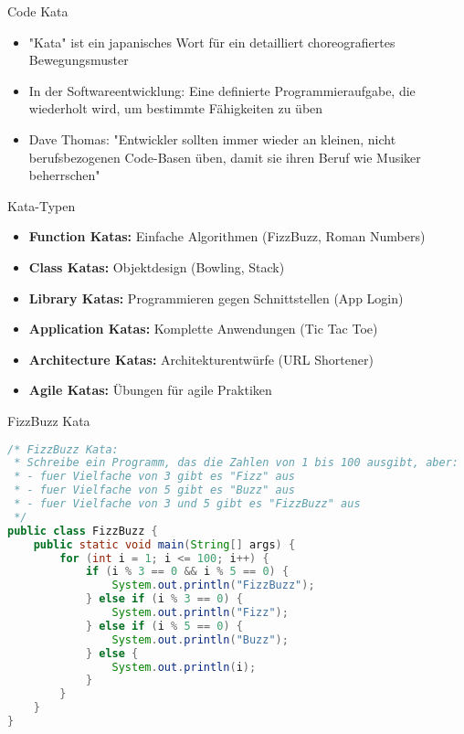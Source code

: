 \begin{definition}{Code Kata}\\
    \begin{itemize}
        \item "Kata" ist ein japanisches Wort für ein detailliert choreografiertes Bewegungsmuster
        \item In der Softwareentwicklung: Eine definierte Programmieraufgabe, die wiederholt wird, um bestimmte Fähigkeiten zu üben
        \item Dave Thomas: "Entwickler sollten immer wieder an kleinen, nicht berufsbezogenen Code-Basen üben, damit sie ihren Beruf wie Musiker beherrschen"
    \end{itemize}
\end{definition}

\begin{concept}{Kata-Typen}\\
    \begin{itemize}
        \item \textbf{Function Katas:} Einfache Algorithmen (FizzBuzz, Roman Numbers)
        \item \textbf{Class Katas:} Objektdesign (Bowling, Stack)
        \item \textbf{Library Katas:} Programmieren gegen Schnittstellen (App Login)
        \item \textbf{Application Katas:} Komplette Anwendungen (Tic Tac Toe)
        \item \textbf{Architecture Katas:} Architekturentwürfe (URL Shortener)
        \item \textbf{Agile Katas:} Übungen für agile Praktiken
    \end{itemize}
\end{concept}

\begin{examplecode}{FizzBuzz Kata}\\
\begin{lstlisting}[language=Java, style=basesmol]
/* FizzBuzz Kata:
 * Schreibe ein Programm, das die Zahlen von 1 bis 100 ausgibt, aber:
 * - fuer Vielfache von 3 gibt es "Fizz" aus
 * - fuer Vielfache von 5 gibt es "Buzz" aus
 * - fuer Vielfache von 3 und 5 gibt es "FizzBuzz" aus
 */
public class FizzBuzz {
    public static void main(String[] args) {
        for (int i = 1; i <= 100; i++) {
            if (i % 3 == 0 && i % 5 == 0) {
                System.out.println("FizzBuzz");
            } else if (i % 3 == 0) {
                System.out.println("Fizz");
            } else if (i % 5 == 0) {
                System.out.println("Buzz");
            } else {
                System.out.println(i);
            }
        }
    }
}
\end{lstlisting}
\end{examplecode}

